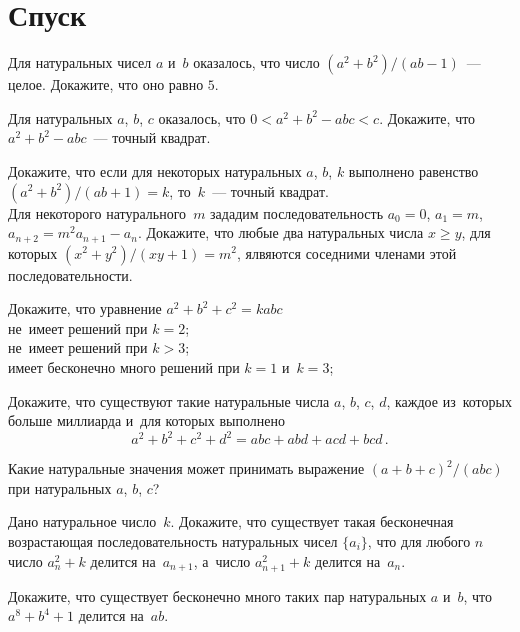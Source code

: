 
\section*{Спуск}


\begin{problems}

\item
Для натуральных чисел $a$ и~$b$ оказалось, что число
$(a^2 + b^2) / (a b - 1)$~--- целое.
Докажите, что оно равно $5$.

\item
Для натуральных $a$, $b$, $c$ оказалось, что $0 < a^2 + b^2 - a b c < c$.
Докажите, что $a^2 + b^2 - a b c$~--- точный квадрат.

\item
\subproblem
Докажите, что если для некоторых натуральных $a$, $b$, $k$ выполнено
равенство $(a^2 + b^2) / (a b + 1) = k$, то~$k$~--- точный квадрат.
\\
\subproblem
Для некоторого натурального~$m$ зададим последовательность
$a_0 = 0$, $a_1 = m$, $a_{n+2} = m^2 a_{n+1} - a_n$.
Докажите, что любые два натуральных числа $x \geq y$, для которых
$(x^2 + y^2) / (x y + 1) = m^2$, ялвяются соседними членами этой
последовательности.

\item
Докажите, что уравнение $a^2 + b^2 + c^2 = k a b c$
\\
\subproblem не~имеет решений при $k = 2$;
\\
\subproblem не~имеет решений при $k > 3$;
\\
\subproblem имеет бесконечно много решений при $k = 1$ и~$k = 3$;

\item
Докажите, что существуют такие натуральные числа $a$, $b$, $c$, $d$, каждое
из~которых больше миллиарда и~для которых выполнено
\[
    a^2 + b^2 + c^2 + d^2
=
    a b c + a b d + a c d + b c d
\, . \]

\item
Какие натуральные значения может принимать выражение
$(a + b + c)^2 / (a b c)$ при натуральных $a$, $b$, $c$?

\item
Дано натуральное число~$k$.
Докажите, что существует такая бесконечная возрастающая последовательность
натуральных чисел $\{ a_{i} \}$, что для любого $n$ число $a_{n}^2 + k$ делится
на~$a_{n+1}$, а~число $a_{n+1}^2 + k$ делится на~$a_{n}$.

\item
Докажите, что существует бесконечно много таких пар натуральных $a$ и~$b$, что
$a^8 + b^4 + 1$ делится на~$a b$.

\end{problems}

